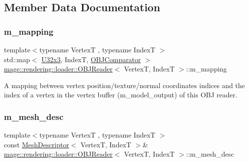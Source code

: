 \subsection{Member Data Documentation}
\mbox{\label{classmage_1_1rendering_1_1loader_1_1_o_b_j_reader_a4bad8aafabddb5cec68be8357d2d7566}} 
\subsubsection{\texorpdfstring{m\+\_\+mapping}{m\_mapping}}
{\footnotesize\ttfamily template$<$typename VertexT , typename IndexT $>$ \\
std\+::map$<$ \mbox{\hyperlink{namespacemage_a1e9348414b777b1a460dc4f295bc87fc}{U32x3}}, IndexT, \mbox{\hyperlink{structmage_1_1rendering_1_1loader_1_1_o_b_j_reader_1_1_o_b_j_comparator}{O\+B\+J\+Comparator}} $>$ \mbox{\hyperlink{classmage_1_1rendering_1_1loader_1_1_o_b_j_reader}{mage\+::rendering\+::loader\+::\+O\+B\+J\+Reader}}$<$ VertexT, IndexT $>$\+::m\+\_\+mapping\hspace{0.3cm}{\ttfamily [private]}}

A mapping between vertex position/texture/normal coordinates\textquotesingle{} indices and the index of a vertex in the vertex buffer ({\ttfamily m\+\_\+model\+\_\+output}) of this O\+BJ reader. \mbox{\label{classmage_1_1rendering_1_1loader_1_1_o_b_j_reader_aa029c035456ea9456d63726b15e5db05}} 
\subsubsection{\texorpdfstring{m\+\_\+mesh\+\_\+desc}{m\_mesh\_desc}}
{\footnotesize\ttfamily template$<$typename VertexT , typename IndexT $>$ \\
const \mbox{\hyperlink{classmage_1_1rendering_1_1_mesh_descriptor}{Mesh\+Descriptor}}$<$ VertexT, IndexT $>$\& \mbox{\hyperlink{classmage_1_1rendering_1_1loader_1_1_o_b_j_reader}{mage\+::rendering\+::loader\+::\+O\+B\+J\+Reader}}$<$ VertexT, IndexT $>$\+::m\+\_\+mesh\+\_\+desc\hspace{0.3cm}{\ttfamily [private]}}

